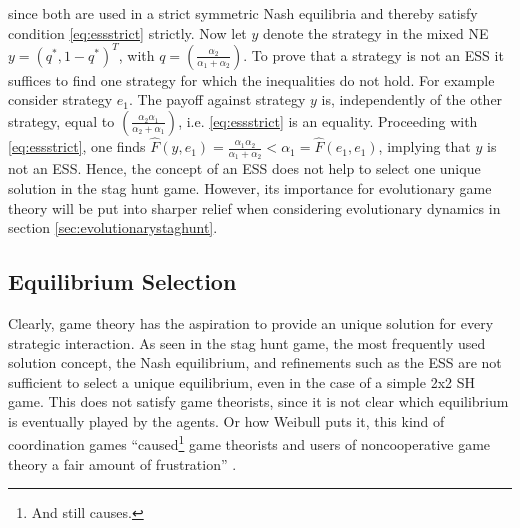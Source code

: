 since both are used in a strict symmetric Nash equilibria and thereby 
satisfy condition \eqref{eq:essstrict} strictly. 
Now let $y$ denote the strategy in the mixed NE $y=(q^*,1-q^*)^T$, 
with $q=\left(\frac{\alpha_2}{\alpha_1+\alpha_2}\right)$.
To prove that a strategy is not an ESS it suffices to find one
strategy for which the inequalities do not hold.
For example consider strategy $e_1$.
The payoff against strategy $y$ is, independently of the other strategy, 
equal to $\left(\frac{\alpha_2 \alpha_1}{\alpha_2+\alpha_1}\right)$, i.e. 
\eqref{eq:essstrict} is an equality.
Proceeding with \eqref{eq:essstrict}, one finds
$\hat{F}(y,e_1) = \frac{\alpha_1 \alpha_2}{\alpha_1+\alpha_2}
< \alpha_1 = \hat{F}(e_1,e_1)$, implying that $y$ is not an ESS.
Hence, the concept of an ESS does not help to select one 
unique solution in the stag hunt game. However, its importance for
evolutionary game theory will be put into sharper relief when considering
evolutionary dynamics in section \ref{sec:evolutionarystaghunt}. 


\subsection{Equilibrium Selection}
\label{sec:equilibriumselection}
Clearly, game theory has the aspiration to provide an unique solution for 
every strategic interaction.
As seen in the stag hunt game, the most frequently used solution concept, 
the Nash equilibrium, and refinements such as the ESS are
not sufficient to select a unique equilibrium, even in the case of a simple
2x2 SH game. This does not satisfy game theorists, since it is not clear which
equilibrium is eventually played by the agents. Or how 
Weibull puts it, this kind of coordination games 
``caused\footnote{And still causes.} game theorists and users of 
noncooperative game theory a fair amount of frustration'' 
\parencite[30]{weibull_evolutionary_1997}. 

